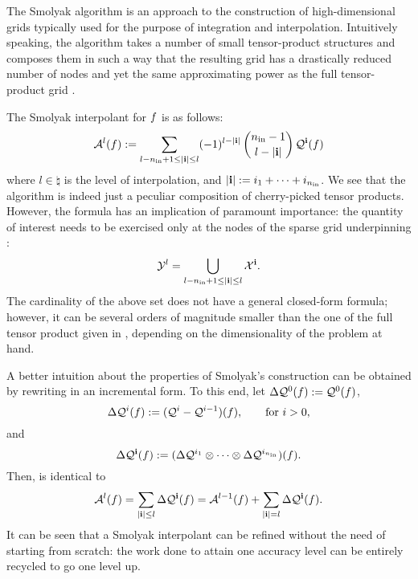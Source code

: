 The Smolyak algorithm is an approach to the construction of high-dimensional
grids typically used for the purpose of integration and interpolation.
Intuitively speaking, the algorithm takes a number of small tensor-product
structures and composes them in such a way that the resulting grid has a
drastically reduced number of nodes and yet the same approximating power as the
full tensor-product grid \cite{klimke2006}.

The Smolyak interpolant for $f$ is as follows:
\begin{equation} \elab{smolyak}
  \smolyak{l}(\f) := \sum_{l - \nin + 1 \leq |\vi| \leq l} (-1)^{l - |\vi|} \, {\nin - 1 \choose l - |\vi|} \, \tensor{\vi}(\f)
\end{equation}
where $l \in \natural$ is the level of interpolation, and $|\mathbf{i}| := i_1 + \dots
+ i_{n_\text{in}}$. We see that the algorithm is indeed just a peculiar composition of
cherry-picked tensor products. However, the formula has an implication of
paramount importance: the quantity of interest needs to be exercised only at the
nodes of the sparse grid underpinning :
\begin{equation} \elab{smolyak-grid}
  \Y^l = \bigcup_{l - \nin + 1 \leq |\vi| \leq l} \X^\vi.
\end{equation}
The cardinality of the above set does not have a general closed-form formula;
however, it can be several orders of magnitude smaller than the one of the full
tensor product given in , depending on the
dimensionality of the problem at hand.

A better intuition about the properties of Smolyak's construction can be
obtained by rewriting  in an incremental form. To this end, let
$\Delta\mathcal{Q}^{0}(f) := \mathcal{Q}^{0}(f)$,
\begin{equation} \elab{tensor-delta-1d}
  \Delta\tensor{i}(\f) := (\tensor{i} - \tensor{i - 1})(\f), \qquad \text{for $i > 0$},
\end{equation}
and
\[
  \Delta\mathcal{Q}^{\mathbf{i}}(f) := (\Delta\mathcal{Q}^{i_1} \otimes \cdots \otimes \Delta\mathcal{Q}^{i_{n_\text{in}}})(f).
\]
Then,  is identical to
\begin{equation} \elab{smolyak-incremental}
  \smolyak{l}(\f) = \sum_{|\vi| \leq l} \Delta\tensor{\vi}(\f) = \smolyak{l - 1}(\f) + \sum_{|\vi| = l} \Delta\tensor{\vi}(\f).
\end{equation}
It can be seen that a Smolyak interpolant can be refined without the need of
starting from scratch: the work done to attain one accuracy level can be
entirely recycled to go one level up.

